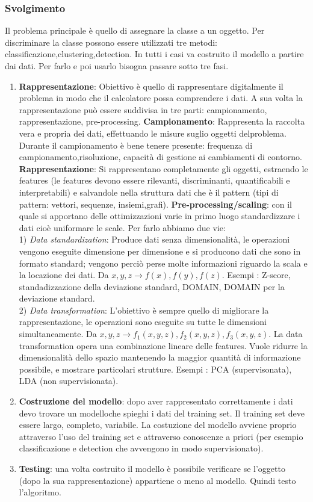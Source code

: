 \documentclass{article}
\begin{document}
\subsubsection*{Svolgimento}
Il problema principale è quello di assegnare la classe a un oggetto. Per discriminare la classe possono essere utilizzati tre metodi: classificazione,clustering,detection. In tutti i casi va costruito il modello a partire dai dati. Per farlo e poi usarlo bisogna passare sotto tre fasi.
\begin{enumerate}
    \item \textbf{Rappresentazione}: Obiettivo è quello di rappresentare digitalmente il problema in modo che il calcolatore possa comprendere i dati. A sua volta la rappresentazione può essere suddivisa in tre parti: campionamento, rappresentazione, pre-processing.
        \subitem \textbf{Campionamento}: Rappresenta la raccolta vera e propria dei dati, effettuando le misure suglio oggetti delproblema. Durante il campionamento è bene tenere presente: frequenza di campionamento,risoluzione, capacità di gestione ai cambiamenti di contorno.
        \subitem \textbf{Rappresentazione}: Si rappresentano completamente gli oggetti, estraendo le features (le features devono essere rilevanti, discriminanti, quantificabili e interpretabili) e salvandole nella struttura dati che è il pattern (tipi di pattern: vettori, sequenze, insiemi,grafi).
        \subitem \textbf{Pre-processing/scaling}: con il quale si apportano delle ottimizzazioni varie in primo luogo standardizzare i dati cioè uniformare le scale. Per farlo abbiamo due vie:\\
        1) \textit{Data standardization}: Produce dati senza dimensionalità, le operazioni vengono eseguite dimensione per dimensione e si producono dati che sono in formato standard; vengono perciò perse molte informazioni riguardo la scala e la locazione dei dati. Da $x,y,z \rightarrow f(x),f(y),f(z)$. Esempi : Z-score, standadizzazione della deviazione standard, DOMAIN, DOMAIN per la deviazione standard.\\
        2) \textit{Data transformation}:  L'obiettivo è sempre quello di migliorare la rappresentazione, le operazioni sono eseguite su tutte le dimensioni simultaneamente. Da $x,y,z \rightarrow f_1(x,y,z),f_2(x,y,z),f_3(x,y,z)$. La data transformation opera una combinazione lineare delle features. Vuole ridurre la dimensionalità dello spazio mantenendo la maggior quantità di informazione possibile, e mostrare particolari strutture. Esempi : PCA (supervisonata), LDA (non supervisionata).
    \item \textbf{Costruzione del modello}: dopo aver rappresentato correttamente i dati devo trovare un modelloche spieghi i dati del training set. Il training set deve essere largo, completo, variabile. La costuzione del modello avviene proprio attraverso l'uso del training set e attraverso conoscenze a priori (per esempio classificazione e detection che avvengono in modo supervisionato).
    \item \textbf{Testing}: una volta costruito il modello è possibile verificare se l'oggetto (dopo la sua rappresentazione) appartiene o meno al modello. Quindi testo l'algoritmo.
\end{enumerate}
\end{document}
